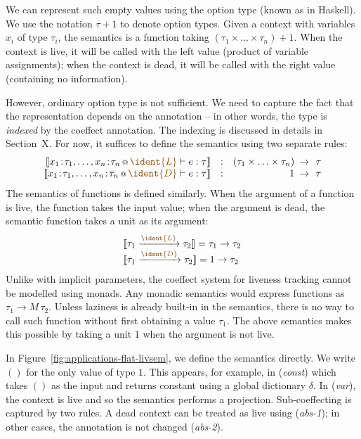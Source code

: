We can represent such empty values using the option type (known as  in Haskell).
We use the notation $\tau + 1$ to denote option types. Given a context with variables $x_i$ of
type $\tau_i$, the semantics is a function taking $(\tau_1 \times \ldots \times \tau_n) + 1$.
When the context is live, it will be called with the left value (product of variable assignments);
when the context is dead, it will be called with the right value (containing no information).

However, ordinary option type is not sufficient. We need to capture the fact that the 
representation depends on the annotation -- in other words, the type is \emph{indexed} by 
the coeffect annotation. The indexing is discussed in details in Section~X. For now, it suffices
to define the semantics using two separate rules:
%
\begin{equation*}
\begin{array}{rlrcl}
\sem{\coctx{x_1\!:\!\tau_1, \ldots, x_n\!:\!\tau_n}{ \aclrd{\ident{L}} } \vdash e : \tau} 
  &:& (\tau_1 \times \ldots \times \tau_n) &\narrow{\rightarrow}& \tau\\
\sem{\coctx{x_1\!:\!\tau_1, \ldots, x_n\!:\!\tau_n}{ \aclrd{\ident{D}} } \vdash e : \tau} 
  &:& 1 &\narrow{\rightarrow}& \tau
\end{array}
\end{equation*}
%
The semantics of functions is defined similarly. When the argument of a function is live, the function 
takes the input value; when the argument is dead, the semantic function takes a unit as its argument:
%
\begin{equation*}
\begin{array}{l}
\sem{\tau_1 \xrightarrow{\aclrd{\ident{L}}} \tau_2} = \tau_1 \rightarrow \tau_2\\
\sem{\tau_1 \xrightarrow{\aclrd{\ident{D}}} \tau_2} = 1 \rightarrow \tau_2
\end{array}
\end{equation*}
%
Unlike with implicit parameters, the coeffect system for liveness tracking cannot be modelled 
using monads. Any monadic semantics would express functions as $\tau_1 \rightarrow M\, \tau_2$.
Unless laziness is already built-in in the semantics, there is no way to call such function without
first obtaining a value $\tau_1$. The above semantics makes this possible by taking a unit $1$ when
the argument is not live.

In Figure~\ref{fig:applications-flat-livsem}, we define the semantics directly. We write $()$ for
the only value of type $1$. This appears, for example, in (\emph{const}) which takes $()$ as the
input and returns constant using a global dictionary $\delta$. In (\emph{var}), the context is live
and so the semantics performs a projection. Sub-coeffecting is captured by two rules. A dead context 
can be treated as live using (\emph{abs-1}); in other cases, the annotation is not changed (\emph{abs-2}).

